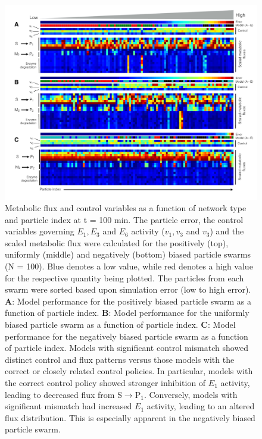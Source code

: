 \documentclass[processes,article,accept,moreauthors,pdftex,12pt,a4paper]{mdpi}
\begin{document}
\begin{figure}[H]
\centering
\includegraphics[width=1.0\textwidth,height=0.6\textheight]{./figs/Figure-8-Flux.pdf}
\caption{Metabolic flux and control variables as a function of network type and particle index at t = 100 min.
The particle error, the control variables governing $E_{1},E_{3}$ and $E_{6}$ activity ($v_{1},v_{3}$ and $v_{3}$) and the scaled metabolic flux were calculated for the positively (top), 
uniformly (middle) and negatively (bottom) biased particle swarms (N = 100). 
Blue denotes a low value, while red denotes a high value for the respective quantity being plotted.
The particles from each swarm were sorted based upon simulation error (low to high error). 
\textbf{A}: Model performance for the positively biased particle swarm as a function of particle index.
\textbf{B}: Model performance for the uniformly biased particle swarm as a function of particle index.
\textbf{C}: Model performance for the negatively biased particle swarm as a function of particle index. 
Models with significant control mismatch showed distinct control and flux patterns versus those models with the correct or closely related control policies.
In particular, models with the correct control policy showed stronger inhibition of $E_{1}$ activity, leading to decreased flux from S$\rightarrow$P$_{1}$.
Conversely, models with significant mismatch had increased $E_{1}$ activity, leading to an altered flux distribution. 
This is especially apparent in the negatively biased particle swarm. }\label{fig-flux-pattern}
\end{figure}
\end{document}
